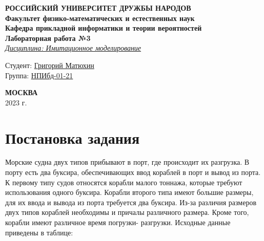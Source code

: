 \documentclass[12pt]{article}
\begin{document}
\begin{titlepage}

	\begin{center}
		\hfill \break
		\textbf{
			\large{РОССИЙСКИЙ УНИВЕРСИТЕТ ДРУЖБЫ НАРОДОВ}\\
			\normalsize{Факультет физико-математических и естественных наук}\\
			\normalsize{Кафедра прикладной информатики и теории вероятностей}\\
		}
		\vspace*{\fill}
		\Large{\textbf{Лабораторная работа №3}}
		\\
		\underline{\textit{\normalsize{Дисциплина: Имитационное моделирование}}}
		\vspace*{\fill}

	\end{center}

	\begin{flushright}
		Студент: \underline{Григорий Матюхин}\\ \vspace{0.5cm}
		Группа: \underline{НПИбд-01-21}
	\end{flushright}


	\begin{center} \textbf{МОСКВА} \\ 2023 г. \end{center}
	\thispagestyle{empty} %

\end{titlepage}
\newpage
\tableofcontents
\newpage

\section{Постановка задания}
Морские судна двух типов прибывают в порт, где происходит их разгрузка. В порту есть
два буксира, обеспечивающих ввод кораблей в порт и вывод из порта. К первому типу
судов относятся корабли малого тоннажа, которые требуют использования одного
буксира. Корабли второго типа имеют большие размеры, для их ввода и вывода из порта
требуется два буксира. Из-за различия размеров двух типов кораблей необходимы и
причалы различного размера. Кроме того, корабли имеют различное время погрузки-
разгрузки. Исходные данные приведены в таблице:
\end{document}
